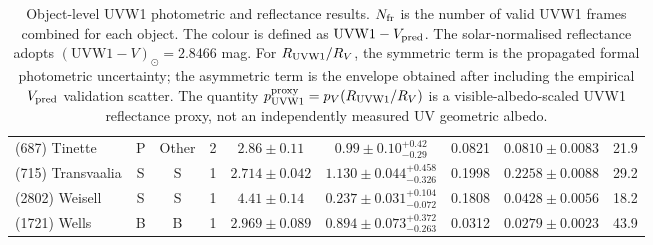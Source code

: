 \begin{table}[t]
\begin{tabular}{lcccccccc}
(687) Tinette & P & Other & 2 & $2.86 \pm 0.11$ & $0.99 \pm 0.10{}_{-0.29}^{+0.42}$ & 0.0821 & $0.0810 \pm 0.0083$ & 21.9 \\
(715) Transvaalia & S & S & 1 & $2.714 \pm 0.042$ & $1.130 \pm 0.044{}_{-0.326}^{+0.458}$ & 0.1998 & $0.2258 \pm 0.0088$ & 29.2 \\
(2802) Weisell & S & S & 1 & $4.41 \pm 0.14$ & $0.237 \pm 0.031{}_{-0.072}^{+0.104}$ & 0.1808 & $0.0428 \pm 0.0056$ & 18.2 \\
(1721) Wells & B & B & 1 & $2.969 \pm 0.089$ & $0.894 \pm 0.073{}_{-0.263}^{+0.372}$ & 0.0312 & $0.0279 \pm 0.0023$ & 43.9 \\
\bottomrule
\end{tabular}
\caption{Object-level UVW1 photometric and reflectance results. $N_{\rm fr}$ is the number of valid UVW1 frames combined for each object. The colour is defined as $\mathrm{UVW1}-V_{\rm pred}$. The solar-normalised reflectance adopts $(\mathrm{UVW1}-V)_\odot=2.8466$ mag. For $R_{\rm UVW1}/R_V$, the symmetric term is the propagated formal photometric uncertainty; the asymmetric term is the envelope obtained after including the empirical $V_{\rm pred}$ validation scatter. The quantity $p_{\rm UVW1}^{\rm proxy}=p_V(R_{\rm UVW1}/R_V)$ is a visible-albedo-scaled UVW1 reflectance proxy, not an independently measured UV geometric albedo.}
\label{tab:uvw1_reflectance_results}
\end{table}
